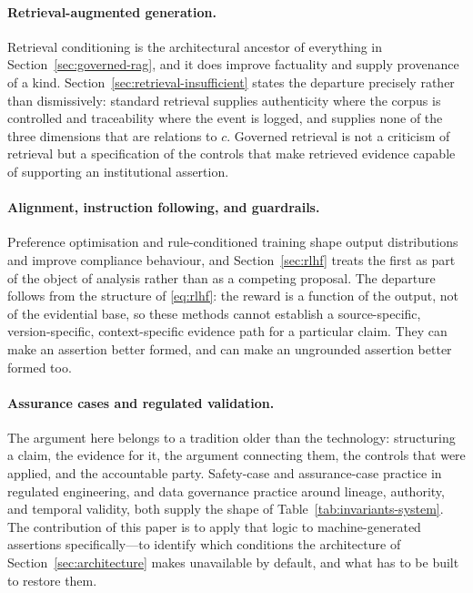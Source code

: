 \documentclass[11pt]{article}
\theoremstyle{plain}
\theoremstyle{definition}
\begin{document}
\paragraph{Retrieval-augmented generation.} Retrieval conditioning
\citep{lewis2020} is the architectural ancestor of everything in
Section~\ref{sec:governed-rag}, and it does improve factuality and supply
provenance of a kind. Section~\ref{sec:retrieval-insufficient} states the
departure precisely rather than dismissively: standard retrieval supplies
authenticity where the corpus is controlled and traceability where the event is
logged, and supplies none of the three dimensions that are relations to $c$.
Governed retrieval is not a criticism of retrieval but a specification of the
controls that make retrieved evidence capable of supporting an institutional
assertion.

\paragraph{Alignment, instruction following, and guardrails.} Preference
optimisation \citep{ouyang2022} and rule-conditioned training
\citep{bai2022} shape output distributions and improve compliance behaviour, and
Section~\ref{sec:rlhf} treats the first as part of the object of analysis rather
than as a competing proposal. The departure follows from the structure of
\eqref{eq:rlhf}: the reward is a function of the output, not of the evidential
base, so these methods cannot establish a source-specific, version-specific,
context-specific evidence path for a particular claim. They can make an assertion
better formed, and can make an ungrounded assertion better formed too.

\paragraph{Assurance cases and regulated validation.} The argument here belongs to
a tradition older than the technology: structuring a claim, the evidence for it,
the argument connecting them, the controls that were applied, and the accountable
party. Safety-case and assurance-case practice in regulated engineering, and data
governance practice around lineage, authority, and temporal validity, both supply
the shape of Table~\ref{tab:invariants-system}. The contribution of this paper is to
apply that logic to machine-generated assertions specifically---to identify which
conditions the architecture of Section~\ref{sec:architecture} makes unavailable by
default, and what has to be built to restore them.
\end{document}
